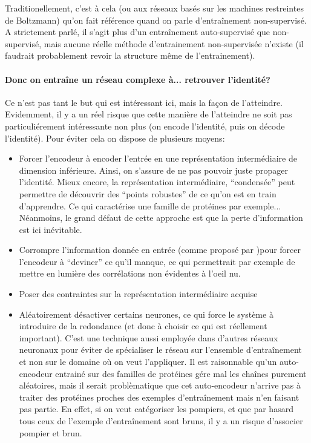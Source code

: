 \documentclass[a4paper,11pt]{article}
\begin{document}
Traditionellement, c'est à cela (ou aux réseaux basés sur les machines
restreintes de Boltzmann) qu'on fait référence quand on parle d'entraînement
non-supervisé. A strictement parlé, il s'agit plus d'un entraînement
auto-supervisé que non-supervisé, mais aucune réelle méthode d'entrainement
non-supervisée n'existe (il faudrait probablement revoir la structure même de
l'entrainement).

\paragraph{Donc on entraîne un réseau complexe à... retrouver l'identité?}

Ce n'est pas tant le but qui est intéressant ici, mais la façon de l'atteindre.
Evidemment, il y a un réel risque que cette manière de l'atteindre ne soit pas
particuliérement intéressante non plus (on encode l'identité, puis on décode
l'identité). Pour éviter cela on dispose de plusieurs moyens:

\begin{itemize}
\item Forcer l'encodeur à encoder l'entrée en une représentation intermédiaire
  de dimension inférieure. Ainsi, on s'assure de ne pas pouvoir juste propager
  l'identité. Mieux encore, la représentation intermédiaire, ``condensée'' peut
  permettre de découvrir des ``points robustes'' de ce qu'on est en train
  d'apprendre. Ce qui caractérise une famille de protéines par exemple...
  Néanmoins, le grand défaut de cette approche est que la perte d'information
  est ici inévitable.
\item Corrompre l'information donnée en entrée (comme proposé par \cite{Vincent:2008:ECR:1390156.1390294})pour forcer l'encodeur à
  ``deviner'' ce qu'il manque, ce qui permettrait par exemple de mettre en
  lumière des corrélations non évidentes à l'oeil nu.
\item Poser des contraintes sur la représentation intermédiaire acquise
\item Aléatoirement désactiver certains neurones, ce qui force le système à
  introduire de la redondance (et donc à choisir ce qui est réellement
  important). C'est une technique aussi employée dans d'autres réseaux neuronaux
  pour éviter de spécialiser le réseau sur l'ensemble d'entraînement et non sur
  le domaine où on veut l'appliquer. Il est raisonnable qu'un auto-encodeur
  entrainé sur des familles de protéines gére mal les chaînes purement
  aléatoires, mais il serait problèmatique que cet auto-encodeur n'arrive pas à
  traiter des protéines proches des exemples d'entraînement mais n'en faisant
  pas partie. En effet, si on veut catégoriser les pompiers, et que par hasard
  tous ceux de l'exemple d'entraînement sont bruns, il y a un risque d'associer
  pompier et brun.
\end{itemize}
\end{document}
